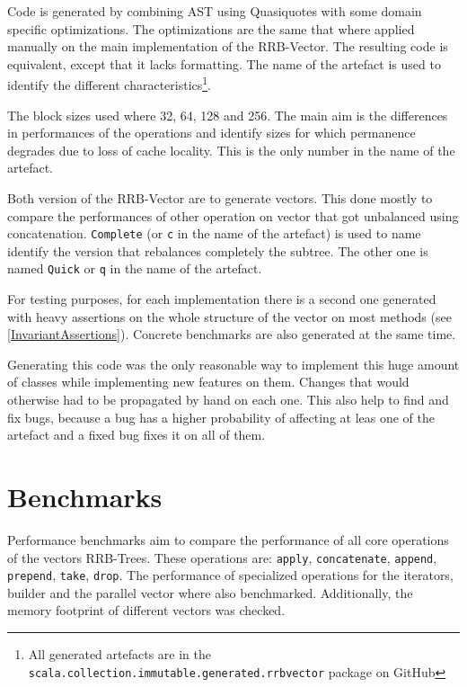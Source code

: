 Code is generated by combining AST using Quasiquotes with some domain specific optimizations. The optimizations are the same that where applied manually on the main implementation of the RRB-Vector. The resulting code is equivalent, except that it lacks formatting. The name of the artefact is used to identify the different characteristics\footnote{All generated artefacts are in the \texttt{scala.collection.immutable.generated.rrbvector} package on GitHub}.

The block sizes used where 32, 64, 128 and 256. 
The main aim is the differences in performances of the operations and identify sizes for which permanence degrades due to loss of cache locality. 
This is the only number in the name of the artefact.

Both version of the RRB-Vector are to generate vectors. 
This done mostly to compare the performances of other operation on vector that got unbalanced using concatenation. 
\texttt{Complete} (or \texttt{c} in the name of the artefact) is used to name identify the version that rebalances completely the subtree. 
The other one is named \texttt{Quick} or \texttt{q} in the name of the artefact.

For testing purposes, for each implementation there is a second one generated with heavy assertions on the whole structure of the vector on most methods (see \ref{InvariantAssertions}). 
Concrete benchmarks are also generated at the same time.

Generating this code was the only reasonable way to implement this huge amount of classes while implementing new features on them. 
Changes that would otherwise had to be propagated by hand on each one. 
This also help to find and fix bugs, because a bug has a higher probability of affecting at leas one of the artefact and a fixed bug fixes it on all of them.

\section{Benchmarks}
Performance benchmarks aim to compare the performance of all core operations of the vectors RRB-Trees. These operations are: \texttt{apply}, \texttt{concatenate}, \texttt{append}, \texttt{prepend}, \texttt{take}, \texttt{drop}. The performance of specialized operations for the iterators, builder and the parallel vector where also benchmarked. Additionally, the memory footprint of different vectors was checked.

